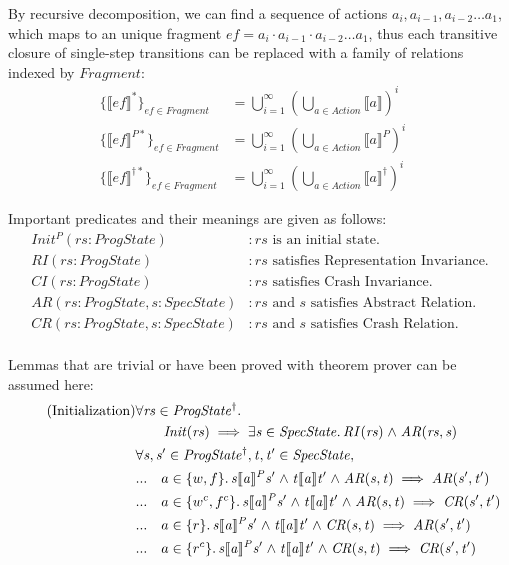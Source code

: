 \documentclass[letterpaper,twocolumn,10pt]{article}
\theoremstyle{definition}
\newcommand{\conj}{\mathrel\land}
\renewcommand{\i}[1]{\ensuremath{\mathit{#1}}}
\begin{document}
By recursive decomposition, we can find a sequence of actions $a_i, a_{i-1}, a_{i-2} \dots a_1$, which maps to an unique fragment $\i{ef} = a_i \cdot a_{i-1} \cdot a_{i-2} \dots a_1$, thus each transitive closure of single-step transitions can be replaced with a family of relations indexed by $\i {Fragment}$:
\begin{align*}
	\{ \llbracket \i{ef} \rrbracket^* \}_\i{ef \in Fragment} &= 
	\bigcup_{i=1}^\infty\left(\bigcup_{a \in Action} \llbracket a \rrbracket \right)^i \quad\\
	\{ \llbracket \i{ef} \rrbracket^{P*} \}_\i{ef \in Fragment} &= 
	\bigcup_{i=1}^\infty\left(\bigcup_{a \in Action} \llbracket a \rrbracket^P \right)^i \quad\\
	\{ \llbracket \i{ef} \rrbracket^{\dagger*} \}_\i{ef \in Fragment} &= 
	\bigcup_{i=1}^\infty\left(\bigcup_{a \in Action} \llbracket a \rrbracket^\dagger \right)^i
\end{align*}

Important predicates and their meanings are given as follows:
\begin{align*}
	\i{Init^P(rs : ProgState)} &: \text{$\i{rs}$ is an initial state.}\\
	\i{RI(rs : ProgState)} &: \text{$\i{rs}$ satisfies Representation Invariance.} \\
	\i{CI(rs : ProgState)} &: \text{$\i{rs}$ satisfies Crash Invariance.} \\
	\i{AR(rs : ProgState, s : SpecState)} &: \text{$\i{rs}$ and $s$ satisfies Abstract Relation.} \\
	\i{CR(rs : ProgState, s : SpecState)} &: \text{$\i{rs}$ and $s$ satisfies Crash Relation.} \\
\end{align*}

Lemmas that are trivial or have been proved with theorem prover can be assumed here:
\begin{align*}
	\tag{Initialization}\label{Initialization} &\forall \i{rs} \in \i{ProgState^\dagger} \ldotp\\
	&\qquad \i{Init(rs) \implies \exists s \in SpecState \ldotp RI(rs) \conj AR(rs, s)}\\
	&\i{\forall s, s' \in ProgState^\dagger, t, t' \in SpecState,}\\
	&...	 \quad a \in \{w, f\} \ldotp \i{s \llbracket a \rrbracket^P s' \conj t \llbracket a \rrbracket t' \conj AR(s, t) \implies AR(s', t')}\\
	&...	 \quad a \in \{w^c, f^c\} \ldotp \i{s \llbracket a \rrbracket^P s' \conj t \llbracket a \rrbracket t' \conj AR(s, t) \implies CR(s', t')}\\
	&...	 \quad a \in \{r\} \ldotp \i{s \llbracket a \rrbracket^P s' \conj t \llbracket a \rrbracket t' \conj CR(s, t) \implies AR(s', t')}\\
	&...	 \quad a \in \{r^c\} \ldotp \i{s \llbracket a \rrbracket^P s' \conj t \llbracket a \rrbracket t' \conj CR(s, t) \implies CR(s', t')}\\
\end{align*}
\end{document}
